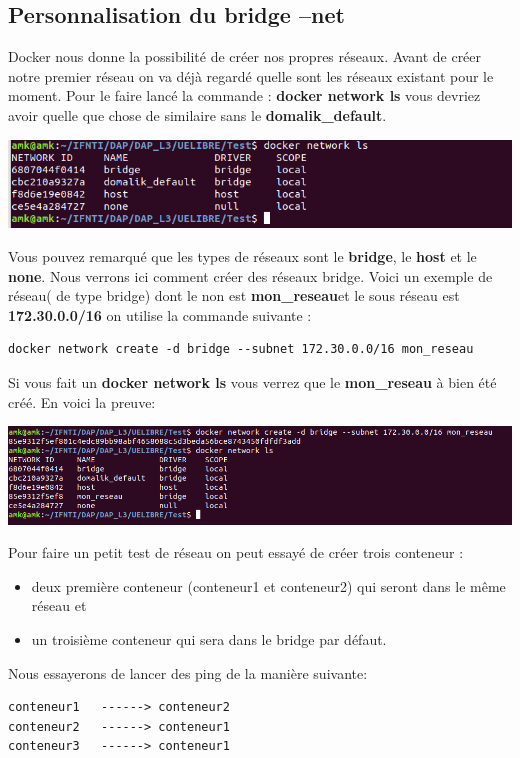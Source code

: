 \documentclass[12pt,a4paper]{article}
\begin{document}
\subsection{Personnalisation du bridge --net}
Docker nous donne la possibilité de créer nos propres réseaux. Avant de créer notre premier 
réseau on va déjà regardé quelle sont les réseaux existant pour le moment. Pour le
faire lancé la commande :  \textbf{docker network ls} vous devriez avoir 
quelle que chose de similaire sans le \textbf{domalik\_default}.
\begin{center}
\includegraphics[scale=0.5]{img/d_networks.png}
\end{center}
Vous pouvez remarqué que les types de réseaux sont le \textbf{bridge}, le \textbf{host} et 
le \textbf{none}. Nous verrons ici comment créer des réseaux bridge.
Voici un exemple de réseau( de type bridge) dont le non est \textbf{mon\_reseau}et le sous
réseau est \textbf{172.30.0.0/16} on utilise
la commande
suivante :\\
\begin{verbatim}
docker network create -d bridge --subnet 172.30.0.0/16 mon_reseau
\end{verbatim}
Si vous fait un \textbf{docker network ls} vous verrez que le \textbf{mon\_reseau} à bien
été créé. En voici la preuve:
\begin{center}
\includegraphics[scale=0.5]{img/my_network.png}
\end{center}
Pour faire un petit test de réseau on peut essayé de créer trois conteneur :
\begin{itemize}
\item deux première conteneur (conteneur1 et conteneur2) qui seront dans le même réseau et
\item un troisième conteneur qui sera dans le bridge par défaut.
\end{itemize}
Nous essayerons de lancer des ping de la manière suivante:
\begin{verbatim}
conteneur1   ------> conteneur2
conteneur2   ------> conteneur1
conteneur3   ------> conteneur1
\end{verbatim}
\end{document}
